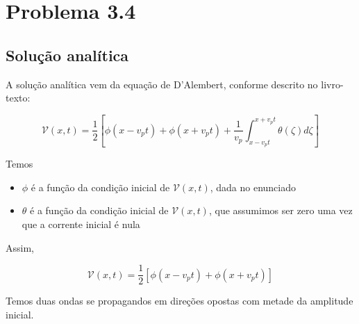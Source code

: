 







\chapter{Problema 3.4}

\section{Solução analítica}

A solução analítica vem da equação de D'Alembert, conforme descrito 
no livro-texto: 

\[ \mathcal{V}(x, t) = \frac{1}{2} \left[ \phi(x - v_p t) + \phi(x + v_p t) + \frac{1}{v_p} \int_{x - v_p t}^{x + v_p t} \theta(\zeta) d\zeta \right] \]

Temos 

\begin{itemize}
	\item $\phi$ é a função da condição inicial de $\mathcal{V}(x, t)$, dada no enunciado
	\item $\theta$ é a função da condição inicial de $\mathcal{V}(x, t)$, que assumimos ser zero
	uma vez que a corrente inicial é nula
\end{itemize}

Assim, 

\[ \mathcal{V}(x, t) = \frac{1}{2} \left[ \phi(x - v_p t) + \phi(x + v_p t) \right] \]  

Temos duas ondas se propagandos em direções opostas com metade da amplitude inicial.

